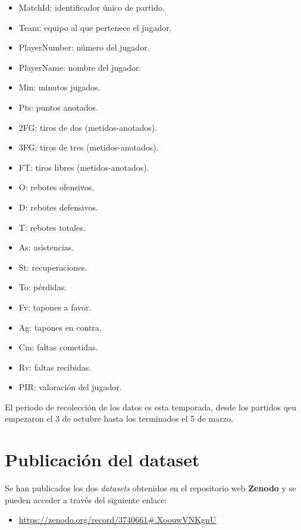 \documentclass[]{article}
\providecommand{\tightlist}{%
  \setlength{\itemsep}{0pt}\setlength{\parskip}{0pt}}
\begin{document}
\begin{itemize}
  \begin{itemize}
  \tightlist
  \item
    MatchId: identificador único de partido.
  \item
    Team: equipo al que pertenece el jugador.
  \item
    PlayerNumber: número del jugador.
  \item
    PlayerName: nombre del jugador.
  \item
    Min: minutos jugados.
  \item
    Pts: puntos anotados.
  \item
    2FG: tiros de dos (metidos-anotados).
  \item
    3FG: tiros de tres (metidos-anotados).
  \item
    FT: tiros libres (metidos-anotados).
  \item
    O: rebotes ofensivos.
  \item
    D: rebotes defensivos.
  \item
    T: rebotes totales.
  \item
    As: asistencias.
  \item
    St: recuperaciones.
  \item
    To: pérdidas.
  \item
    Fv: tapones a favor.
  \item
    Ag: tapones en contra.
  \item
    Cm: faltas cometidas.
  \item
    Rv: faltas recibidas.
  \item
    PIR: valoración del jugador.
  \end{itemize}
\end{itemize}

El periodo de recolección de los datos es esta temporada, desde los
partidos qeu empezaron el 3 de octubre hasta los terminados el 5 de
marzo.

\hypertarget{publicaciuxf3n-del-dataset}{%
\section{Publicación del dataset}\label{publicaciuxf3n-del-dataset}}

Se han publicados los dos \emph{datasets} obtenidos en el repositorio
web \textbf{Zenodo} y se pueden acceder a través del siguiente enlace:

\begin{itemize}
\tightlist
\item
  \url{https://zenodo.org/record/3740661\#.XoouwVNKgnU}
\end{itemize}
\end{document}
